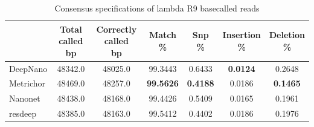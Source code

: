 \documentclass[runningheads,a4paper]{llncs}
\begin{document}
\begin{table}[]
	\caption{Consensus specifications of lambda R9 basecalled reads}
	\label{tbl:spec_lambda}
	\centering
	\begin{tabular}{lcccccc}
		\toprule
		{} &  \thead{Total called\\\lbrack bp\rbrack} &  \thead{Correctly called\\\lbrack bp\rbrack} &  \thead{Match\\\%} &  \thead{Snp\\\%} &  \thead{Insertion\\\%} &  \thead{Deletion\\\%} \\
		\midrule
		DeepNano  &                    48342.0 &                        48025.0 &          99.3443 &         0.6433 &               \textbf{0.0124} &              0.2648 \\
		Metrichor &                    48469.0 &                        48257.0 &          \textbf{99.5626} &         \textbf{0.4188} &               0.0186 &              \textbf{0.1465} \\
		Nanonet   &                    48438.0 &                        48168.0 &          99.4426 &         0.5409 &               0.0165 &              0.1961 \\
		resdeep   &                    48385.0 &                        48163.0 &          99.5412 &         0.4402 &               0.0186 &              0.1976 \\
		\bottomrule
	\end{tabular}
\end{table}
\end{document}
